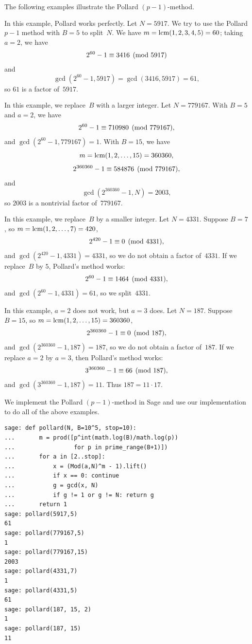 The following examples illustrate the Pollard $(p-1)$-method.
\begin{example}
In this example, Pollard works perfectly.
Let $N=5917$.  We try to use the Pollard $p-1$ method with
$B=5$ to split~$N$.  We have
$m = \operatorname{lcm}(1,2,3,4,5)=60$; taking $a=2$, we have
$$
  2^{60} - 1 \equiv 3416\pmod{5917}
$$
and
$$
 \gcd(2^{60}-1,5917) = \gcd(3416,5917) = 61,
$$
so $61$ is a factor of~$5917$.
\end{example}

\begin{example}
In this example, we replace~$B$ with a larger integer.
Let $N=779167$.  With $B=5$ and $a=2$, we have
$$
   2^{60}-1 \equiv 710980\pmod{779167},
$$
and $\gcd(2^{60}-1,779167) = 1.$
With $B=15$, we have $$m=\operatorname{lcm}(1,2,\ldots,15)=360360,$$
$$
  2^{360360}-1 \equiv 584876\pmod{779167},
$$
and
$$\gcd(2^{360360}-1 , N) = 2003,$$
so $2003$ is a nontrivial factor of~$779167$.
\end{example}


\begin{example}
In this example, we replace~$B$ by a smaller integer.
Let $N=4331$. Suppose  $B=7$, so $m=\operatorname{lcm}(1,2,\ldots,7)=420$,
$$
  2^{420} - 1 \equiv 0 \pmod{4331},
$$
and $\gcd(2^{420} - 1, 4331) = 4331$,
so we do not obtain a factor of~$4331$.
If we replace~$B$ by $5$, Pollard's method works:
$$
  2^{60} - 1\equiv 1464\pmod{4331},
$$
and $\gcd(2^{60}-1,4331) = 61$,
so we split~$4331$.
\end{example}

\begin{example}
In this example, $a=2$ does not work, but $a=3$ does.
Let $N=187$. Suppose  $B=15$, so $m=\operatorname{lcm}(1,2,\ldots,15)=360360$,
$$
  2^{360360} - 1 \equiv 0 \pmod{187},
$$
and $\gcd(2^{360360} - 1, 187) = 187$,
so we do not obtain a factor of~$187$.
If we replace $a=2$ by $a=3$, then Pollard's method works:
$$
  3^{360360} - 1\equiv 66\pmod{187},
$$
and $\gcd(3^{360360}-1,187) = 11$.  Thus $187 = 11\cdot 17$.
\end{example}
\begin{sg}
We implement the Pollard $(p-1)$-method in Sage and use our implementation
to do all of the above examples.
\begin{verbatim}
sage: def pollard(N, B=10^5, stop=10):
...       m = prod([p^int(math.log(B)/math.log(p))
...                 for p in prime_range(B+1)])
...       for a in [2..stop]:
...           x = (Mod(a,N)^m - 1).lift()
...           if x == 0: continue
...           g = gcd(x, N)
...           if g != 1 or g != N: return g
...       return 1
sage: pollard(5917,5)
61
sage: pollard(779167,5)
1
sage: pollard(779167,15)
2003
sage: pollard(4331,7)
1
sage: pollard(4331,5)
61
sage: pollard(187, 15, 2)
1
sage: pollard(187, 15)
11
\end{verbatim}
\end{sg}

